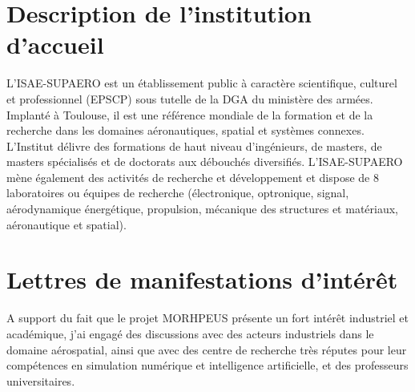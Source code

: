 \documentclass[12pt, french]{article}
\begin{document}
	\section{Description de l'institution d'accueil}
	
	L'ISAE-SUPAERO est un établissement public à caractère scientifique, culturel et professionnel (EPSCP) sous tutelle de la DGA du ministère des armées. Implanté à Toulouse, il est une référence mondiale de la formation et de la recherche dans les domaines aéronautiques, spatial et systèmes connexes. L'Institut délivre des
	formations de haut niveau d'ingénieurs, de masters, de masters spécialisés et de doctorats aux débouchés diversifiés. L'ISAE-SUPAERO mène également des activités de recherche et développement et dispose de 8 laboratoires ou équipes de recherche (électronique, optronique, signal, aérodynamique énergétique, propulsion, mécanique des structures et matériaux, aéronautique et spatial).
	
	
	\appendix
	
	\section{Lettres de manifestations d'intérêt}
	
	A support du fait que le projet MORHPEUS présente un fort intérêt industriel et académique, j'ai engagé des discussions avec des acteurs industriels dans le domaine aérospatial, ainsi que avec des centre de recherche très réputes pour leur compétences en simulation numérique et intelligence artificielle, et des professeurs universitaires. 
	
\end{document}
